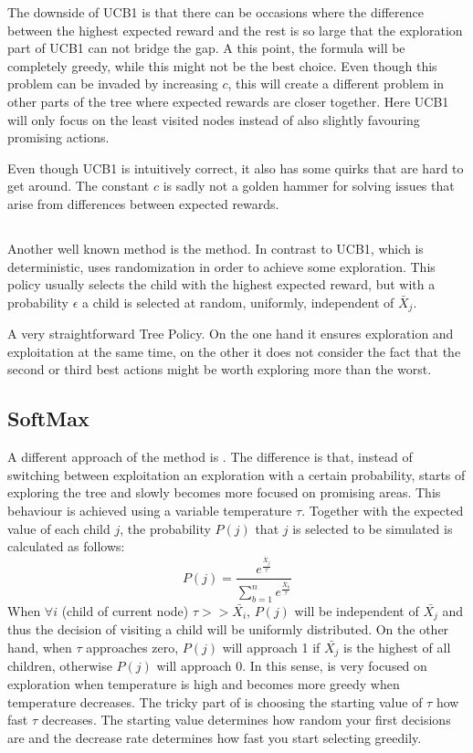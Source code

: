 The downside of UCB1 is that there can be occasions where the difference between the highest expected reward and the rest is so large that the exploration part of UCB1 can not bridge the gap. A this point, the formula will be completely greedy, while this might not be the best choice. Even though this problem can be invaded by increasing $c$, this will create a different problem in other parts of the tree where expected rewards are closer together. Here UCB1 will only focus on the least visited nodes instead of also slightly favouring promising actions.

Even though UCB1 is intuitively correct, it also has some quirks that are hard to get around. The constant $c$ is sadly not a golden hammer for solving issues that arise from differences between expected rewards. 

\subsection{\textbf{\egreedy}}

Another well known method is the \egreedy method\cite{barto1998reinforcement}. In contrast to UCB1, which is deterministic, \egreedy uses randomization in order to achieve some exploration. This policy usually selects the child with the highest expected reward, but with a probability $\epsilon$ a child is selected at random, uniformly, independent of $\bar{X}_j$.

A very straightforward Tree Policy. On the one hand it ensures exploration and exploitation at the same time, on the other it does not consider the fact that the second or third best actions might be worth exploring more than the worst. 

\subsection{SoftMax}
\label{subsec:soft}
A different approach of the \egreedy method is \soft\cite{barto1998reinforcement}. The difference is that, instead of switching between exploitation an exploration with a certain probability, \soft starts of exploring the tree and slowly becomes more focused on promising areas. This behaviour is achieved using a variable temperature $\tau$. Together with the expected value of each child $j$, the probability $P(j)$ that $j$ is selected to be simulated is calculated as follows:  
\begin{equation}
P(j) = \frac{e^\frac{\bar{X}_j}{\tau}}{\sum_{b=1}^{n} e^\frac{\bar{X}_b}{\tau}}
\end{equation}
When $\forall i$ (child of current node) $\tau >> \bar{X_i}$, $P(j)$ will be independent of $\bar{X_j}$ and thus the decision of visiting a child will be uniformly distributed. On the other hand, when $\tau$ approaches zero, $P(j)$ will approach 1 if $\bar{X_j}$ is the highest of all children, otherwise $P(j)$ will approach 0. In this sense, \soft is very focused on exploration when temperature is high and becomes more greedy when temperature decreases. The tricky part of \soft is choosing the starting value of $\tau$ how fast $\tau$ decreases. The starting value determines how random your first decisions are and the decrease rate determines how fast you start selecting greedily. 

